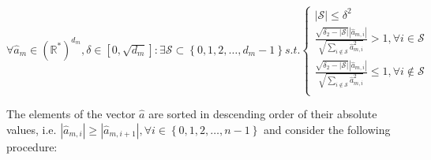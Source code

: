 $\forall \hat{a}_m \in \left(\mathbb{R}^\ast\right)^{d_m}, \delta \in [0, \sqrt{d_m}]: \exists \mathcal{S}\subset\left\{0, 1, 2, \ldots,d_m-1\right\} \textit{s.t.}
\left\{
\begin{array}{lll}
\!|\mathcal{S}| \leq \delta^2 \\
\!\frac{\sqrt{\delta_2 - |\mathcal{S}|}|\hat{a}_{m,i}|}{\sqrt{\sum\limits_{i \notin \mathcal{S}}\hat{a}^2_{m,i}}} > 1, \forall i \in \mathcal{S} \\
\!\frac{\sqrt{\delta_2 - |\mathcal{S}|}|\hat{a}_{m,i}|}{\sqrt{\sum\limits_{i \notin \mathcal{S}}\hat{a}^2_{m,i}}} \leq 1, \forall i \notin \mathcal{S} \\
\end{array}
\right.$

\noindent The elements of the vector $\hat{a}$ are sorted in descending order of their absolute values, i.e. $|\hat{a}_{m,i}| \geq \left|\hat{a}_{m,i+1}\right|, \forall i \in \left\{0, 1, 2, \ldots, n-1\right\}$ and consider the following procedure:

\begin{algorithm}[H]
\end{algorithm}



